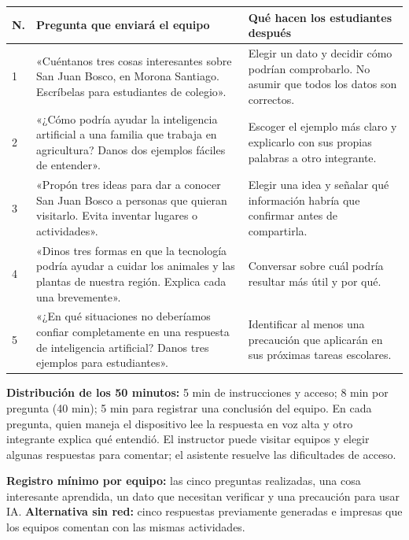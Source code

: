 \documentclass[11pt,a4paper]{article}
\begin{document}
\begin{longtable}{@{}p{0.85cm}p{6.65cm}p{6.2cm}@{}}
\toprule \textbf{N.} & \textbf{Pregunta que enviará el equipo} & \textbf{Qué hacen los estudiantes después}\\\midrule\endhead
1 & «Cuéntanos tres cosas interesantes sobre San Juan Bosco, en Morona Santiago. Escríbelas para estudiantes de colegio». & Elegir un dato y decidir cómo podrían comprobarlo. No asumir que todos los datos son correctos.\\
2 & «¿Cómo podría ayudar la inteligencia artificial a una familia que trabaja en agricultura? Danos dos ejemplos fáciles de entender». & Escoger el ejemplo más claro y explicarlo con sus propias palabras a otro integrante.\\
3 & «Propón tres ideas para dar a conocer San Juan Bosco a personas que quieran visitarlo. Evita inventar lugares o actividades». & Elegir una idea y señalar qué información habría que confirmar antes de compartirla.\\
4 & «Dinos tres formas en que la tecnología podría ayudar a cuidar los animales y las plantas de nuestra región. Explica cada una brevemente». & Conversar sobre cuál podría resultar más útil y por qué.\\
5 & «¿En qué situaciones no deberíamos confiar completamente en una respuesta de inteligencia artificial? Danos tres ejemplos para estudiantes». & Identificar al menos una precaución que aplicarán en sus próximas tareas escolares.\\
\bottomrule
\end{longtable}
\textbf{Distribución de los 50 minutos:} 5 min de instrucciones y acceso; 8 min por pregunta (40 min); 5 min para registrar una conclusión del equipo. En cada pregunta, quien maneja el dispositivo lee la respuesta en voz alta y otro integrante explica qué entendió. El instructor puede visitar equipos y elegir algunas respuestas para comentar; el asistente resuelve las dificultades de acceso.

\textbf{Registro mínimo por equipo:} las cinco preguntas realizadas, una cosa interesante aprendida, un dato que necesitan verificar y una precaución para usar IA. \textbf{Alternativa sin red:} cinco respuestas previamente generadas e impresas que los equipos comentan con las mismas actividades.
\end{document}
